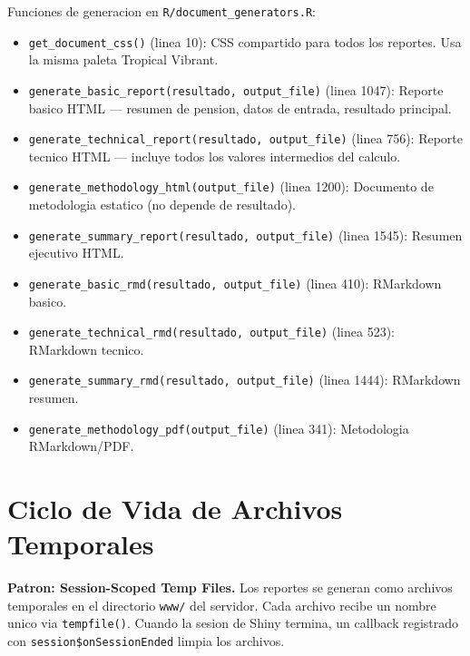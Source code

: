 \documentclass[11pt, letterpaper, twoside]{report}
\begin{document}
\begin{codigobox}
Funciones de generacion en \texttt{R/document\_generators.R}:
\begin{itemize}[nosep]
\item \texttt{get\_document\_css()} (linea 10): CSS compartido para todos los reportes.
      Usa la misma paleta Tropical Vibrant.
\item \texttt{generate\_basic\_report(resultado, output\_file)} (linea 1047): Reporte
      basico HTML --- resumen de pension, datos de entrada, resultado principal.
\item \texttt{generate\_technical\_report(resultado, output\_file)} (linea 756): Reporte
      tecnico HTML --- incluye todos los valores intermedios del calculo.
\item \texttt{generate\_methodology\_html(output\_file)} (linea 1200): Documento de
      metodologia estatico (no depende de resultado).
\item \texttt{generate\_summary\_report(resultado, output\_file)} (linea 1545): Resumen
      ejecutivo HTML.
\item \texttt{generate\_basic\_rmd(resultado, output\_file)} (linea 410): RMarkdown basico.
\item \texttt{generate\_technical\_rmd(resultado, output\_file)} (linea 523): RMarkdown tecnico.
\item \texttt{generate\_summary\_rmd(resultado, output\_file)} (linea 1444): RMarkdown resumen.
\item \texttt{generate\_methodology\_pdf(output\_file)} (linea 341): Metodologia RMarkdown/PDF.
\end{itemize}
\end{codigobox}


\section{Ciclo de Vida de Archivos Temporales}

\begin{patronbox}
\textbf{Patron: Session-Scoped Temp Files.} Los reportes se generan como archivos
temporales en el directorio \texttt{www/} del servidor. Cada archivo recibe un
nombre unico via \texttt{tempfile()}. Cuando la sesion de Shiny termina, un
callback registrado con \texttt{session\$onSessionEnded} limpia los archivos.
\end{patronbox}
\end{document}
